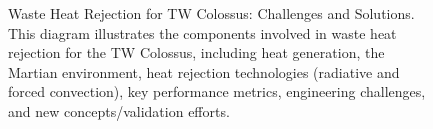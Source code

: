 \documentclass[fontsize=10pt, oneside, DIV=calc]{scrartcl}
\begin{document}
\begin{figure}[H]
  \centering
  \noindent
  \begin{minipage}{\textwidth}
    \centering
    \caption{Waste Heat Rejection for TW Colossus: Challenges and Solutions. This diagram illustrates the components involved in waste heat rejection for the TW Colossus, including heat generation, the Martian environment, heat rejection technologies (radiative and forced convection), key performance metrics, engineering challenges, and new concepts/validation efforts.}
  \end{minipage}
\end{figure}

\begin{comment}
@startuml
!theme materia-outline
scale 1.6

skinparam defaultFontColor black
skinparam backgroundColor white


scale 1.6

skinparam defaultFontColor black
skinparam backgroundColor white


scale 1.4

title ``TW Colossus\nWaste Heat Rejection''

rectangle ``Colossus\n(Heat Source)'' as ColossusHeat

rectangle ``Martian Env\n(Conditions)'' as MarsEnv {
  note right
    Thin CO2
    Low Temp
    Dust
  end note
}

rectangle ``Heat Rejection\nSystem'' as HeatReject

rectangle ``Radiative\nTech'' as Radiative {
    note left
        Large Mass/Area
        Low Eff.
    end note
}

rectangle ``Forced Convection\nTech (FCHX)'' as FCHX {
    note right
        Low Mass/Area
        Higher Eff.
        Req. Fan Power
        Bare Tube Design
    end note
}

rectangle ``Performance\nMetrics'' as Metrics {
    note left
        Mass (kg)
        Area (m2)
        Efficiency (%
        Fan Power (kW)
    end note
}

rectangle ``Engineering\nChallenges'' as Challenges {
    note right
        Low Conv. Transfer
        Dust Fouling
        TW Scale Fan Power
        Opt Design
    end note
}

rectangle ``New Concepts\n& Validation'' as NewConcepts {
    note left
        FCHX Modeling
        Exp. Valid.
        Optimal Geom.
        AI Heat Mgmt
    end note
}


\end{comment}
\end{document}
